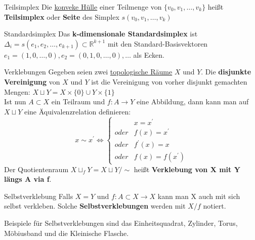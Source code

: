 
\begin{titleDef}{Teilsimplex}
	\label{teilSimplex}
	Die \hyperref[konvHuelle]{konveke Hülle} einer Teilmenge von $\{v_0,v_1,\ldots,v_k\}$ heißt \textbf{Teilsimplex} oder \textbf{Seite} des Simplex $s(v_0,v_1,\ldots,v_k)$
\end{titleDef}

\begin{titleDef}{Standardsimplex}
\label{stdSimplex}
Das \textbf{k-dimensionale Standardsimplex} ist $\Delta_i=s(e_1,e_2,\ldots,e_{k+1})\subset\mathbb{R}^{k+1}$ mit den Standard-Basisvektoren $e_1=(1,0,\ldots,0),e_2=(0,1,0,\ldots,0),\ldots$ als Ecken.
\end{titleDef}

\begin{titleDef}{Verklebungen}
\label{verklebung}
Gegeben seien zwei \hyperref[Topologie]{topologische Räume} $X$ und $Y$. Die \textbf{disjunkte Vereinigung} von $X$ und $Y$ ist die Vereinigung von vorher disjunkt gemachten Mengen: $X\sqcup Y=X\times \{0\}\cup Y\times \{1\}$\\
Ist nun $A\subset X$ ein Teilraum und $f:A\to Y$ eine Abbildung, dann kann man auf $X\sqcup Y$ eine Äquivalenzrelation definieren:
$$x\sim x^\prime \Longleftrightarrow\begin{cases}
	&x=x^\prime\\
	oder&f(x)=x^\prime\\
	oder&f^\prime(x)=x\\
	oder&f(x)=f(x^\prime)
\end{cases}$$
Der Quotientenraum $X\sqcup_f Y=X\sqcup Y/\sim$ heißt \textbf{Verklebung von X mit Y längs A via f}.
\end{titleDef}

\begin{titleDef}{Selbstverklebung}
Falls $X=Y$ und $f:A\subset X\to X$ kann man X auch mit sich selbst verkleben. Solche \textbf{Selbstverklebungen} werden mit $X/f$ notiert.\par
Beispiele für Selbstverklebungen sind das Einheitsquadrat, Zylinder, Torus, Möbiusband und die Kleinische Flasche.
\end{titleDef}